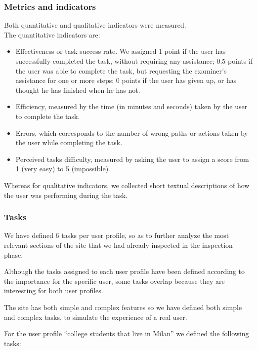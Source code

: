     \subsubsection{Metrics and indicators}
    Both quantitative and qualitative indicators were measured.\\
    The quantitative indicators are:
    \begin{itemize}
        \item Effectiveness or task success rate. We assigned 1 point if the user has successfully completed the task, without requiring any assistance; 0.5 points if the user was able to complete the task, but requesting the examiner's assistance for one or more steps; 0 points if the user has given up, or has thought he has finished when he has not.
        \item Efficiency, measured by the time (in minutes and seconds) taken by the user to complete the task.
        \item Errors, which corresponds to the number of wrong paths or actions taken by the user while completing the task.
        \item Perceived tasks difficulty, measured by asking the user to assign a score from 1 (very easy)  to 5 (impossible).
    \end{itemize}
    
    Whereas for qualitative indicators, we collected short textual descriptions of how the user was performing during the task.

    \subsubsection{Tasks}
    We have defined 6 tasks per user profile, so as to further analyze the most relevant sections of the site that we had already inspected in the inspection phase.

    Although the tasks assigned to each user profile have been defined according to the importance for the specific user, some tasks overlap because they are interesting for both user profiles.

    The site has both simple and complex features so we have defined both simple and complex tasks, to simulate the experience of a real user.
    
    For the user profile ``college students that live in Milan'' we defined the following tasks:

